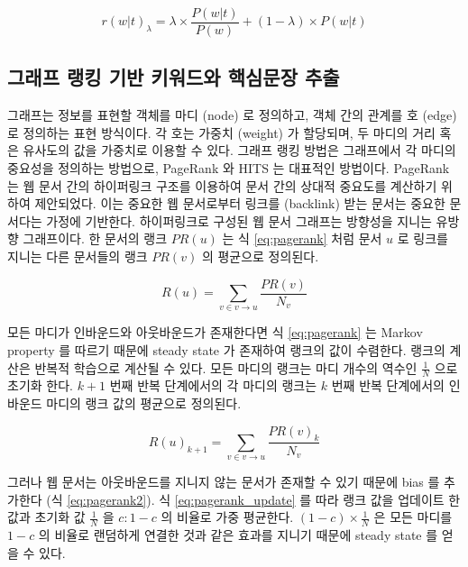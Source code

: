 \documentclass[oneside, ko,phd]{snuthesis_utf8_kor}
\begin{document}
\begin{equation}
  \label{eq:ldavis}
  r(w \vert t)_\lambda = \lambda \times \frac{P(w \vert t)}{P(w)} + (1 - \lambda) \times P(w \vert t)
\end{equation}

\subsection{그래프 랭킹 기반 키워드와 핵심문장 추출}

그래프는 정보를 표현할 객체를 마디 (node) 로 정의하고, 객체 간의 관계를 호 (edge) 로 정의하는 표현 방식이다.
각 호는 가중치 (weight) 가 할당되며, 두 마디의 거리 혹은 유사도의 값을 가중치로 이용할 수 있다.
그래프 랭킹 방법은 그래프에서 각 마디의 중요성을 정의하는 방법으로, PageRank \cite{ilprints422}와 HITS \cite{kleinberg1999authoritative} 는 대표적인 방법이다.
PageRank 는 웹 문서 간의 하이퍼링크 구조를 이용하여 문서 간의 상대적 중요도를 계산하기 위하여 제안되었다.
이는 중요한 웹 문서로부터 링크를 (backlink) 받는 문서는 중요한 문서다는 가정에 기반한다.
하이퍼링크로 구성된 웹 문서 그래프는 방향성을 지니는 유방향 그래프이다.
한 문서의 랭크 $PR(u)$ 는 식 \ref{eq:pagerank} 처럼 문서 $u$ 로 링크를 지니는 다른 문서들의 랭크 $PR(v)$ 의 평균으로 정의된다.

\begin{equation}
  \label{eq:pagerank}
  R(u) = \sum_{v \in v \rightarrow u} \frac{PR(v)}{N_v}
\end{equation}

모든 마디가 인바운드와 아웃바운드가 존재한다면 식 \ref{eq:pagerank} 는 Markov property 를 따르기 때문에 steady state 가 존재하여 랭크의 값이 수렴한다.
랭크의 계산은 반복적 학습으로 계산될 수 있다.
모든 마디의 랭크는 마디 개수의 역수인 $\frac{1}{N}$ 으로 초기화 한다.
$k+1$ 번째 반복 단계에서의 각 마디의 랭크는 $k$ 번째 반복 단계에서의 인바운드 마디의 랭크 값의 평균으로 정의된다.

\begin{equation}
  \label{eq:pagerank_update}
  R(u)_{k+1} = \sum_{v \in v \rightarrow u} \frac{PR(v)_k}{N_v}
\end{equation}

그러나 웹 문서는 아웃바운드를 지니지 않는 문서가 존재할 수 있기 때문에 bias 를 추가한다 (식 \ref{eq:pagerank2}).
식 \ref{eq:pagerank_update} 를 따라 랭크 값을 업데이트 한 값과 초기화 값 $\frac{1}{N}$ 을 $c : 1-c$ 의 비율로 가중 평균한다.
$(1-c) \times \frac{1}{N}$ 은 모든 마디를 $1-c$ 의 비율로 랜덤하게 연결한 것과 같은 효과를 지니기 때문에 steady state 를 얻을 수 있다.
\end{document}
